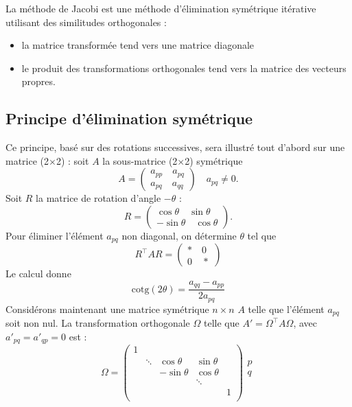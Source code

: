 La méthode de Jacobi est une méthode d'élimination symétrique itérative utilisant des similitudes orthogonales :
\begin{itemize}
	\item la matrice transformée tend vers une matrice diagonale
	\item le produit des transformations orthogonales tend vers la matrice des vecteurs propres.
\end{itemize}

\subsection{Principe d'élimination symétrique}  %
Ce principe, basé sur des rotations successives, sera illustré tout d'abord sur une matrice (2$\times$2) : soit $A$ la sous-matrice (2$\times$2) symétrique 
$$
A=\begin{pmatrix}a_{pp}\quad a_{pq}\\
         a_{pq}\quad a_{qq}
   \end{pmatrix}\quad a_{pq}\neq 0.
$$
Soit $R$ la matrice de rotation d'angle $-\theta$ : 
$$
R = \begin{pmatrix}\cos\theta \quad  \sin\theta\\ 
                  -\sin\theta\quad  \cos\theta
    \end{pmatrix}.
$$
Pour éliminer l'élément $a_{pq}$ non diagonal, on détermine $\theta$ tel que 
$$
R^\top AR=\begin{pmatrix}*\quad0\\0\quad *\end{pmatrix}
$$
Le calcul donne 
$$
\mathrm{cotg}(2\theta)=\frac{a_{qq}-a_{pp}}{2a_{pq}}
$$
Considérons maintenant une matrice symétrique $n\times n$ $A$ telle que l'élément $a_{pq}$ soit non nul. La transformation orthogonale $\Omega$ telle que $A'=\Omega^\top A\Omega$, avec $a'_{pq}=a'_{qp}=0$ est :
$$
\Omega =
\left (
\begin{array}{ccccc}
1&&&&\\
&\ddots& \cos\theta & \sin\theta&\\
&&-\sin\theta & \cos\theta&\\
&&&\ddots&\\
&&&&1\\
\end{array}
\right )
\left .
\begin{array}{c}
p\\
q\\
\\
\end{array}
\right .
$$ 
